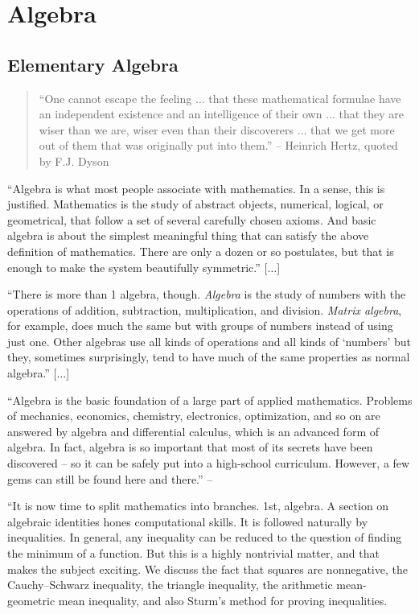 \documentclass[oneside]{book}
\numberwithin{equation}{section}
\begin{document}


\part{Algebra}

\chapter{Elementary Algebra}

\begin{quotation}
	``One cannot escape the feeling $\ldots$ that these mathematical formulae have an independent existence and an intelligence of their own $\ldots$ that they are wiser than we are, wiser even than their discoverers $\ldots$ that we get more out of them that was originally put into them.'' -- Heinrich Hertz, quoted by F.J. Dyson
\end{quotation}
``Algebra is what most people associate with mathematics. In a sense, this is justified. Mathematics is the study of abstract objects, numerical, logical, or geometrical, that follow a set of several carefully chosen axioms. And basic algebra is about the simplest meaningful thing that can satisfy the above definition of mathematics. There are only a dozen or so postulates, but that is enough to make the system beautifully symmetric.'' [$\ldots$]

``There is more than 1 algebra, though. \textit{Algebra} is the study of numbers with the operations of addition, subtraction, multiplication, and division. \textit{Matrix algebra}, for example, does much the same but with groups of numbers instead of using just one. Other algebras use all kinds of operations and all kinds of `numbers' but they, sometimes surprisingly, tend to have much of the same properties as normal algebra.'' [$\ldots$]

``Algebra is the basic foundation of a large part of applied mathematics. Problems of mechanics, economics, chemistry, electronics, optimization, and so on are answered by algebra and differential calculus, which is an advanced form of algebra. In fact, algebra is so important that most of its secrets have been discovered -- so it can be safely put into a high-school curriculum. However, a few gems can still be found here and there.'' -- \cite[Chap. 3, p. 35]{Tao2006}

``It is now time to split mathematics into branches. 1st, algebra. A section on algebraic identities hones computational skills. It is followed naturally by inequalities. In general, any inequality can be reduced to the question of finding the minimum of a function. But this is a highly nontrivial matter, and that makes the subject exciting. We discuss the fact that squares are nonnegative, the Cauchy--Schwarz inequality, the triangle inequality, the arithmetic mean-geometric mean inequality, and also Sturm's method for proving inequalities.
\end{document}
